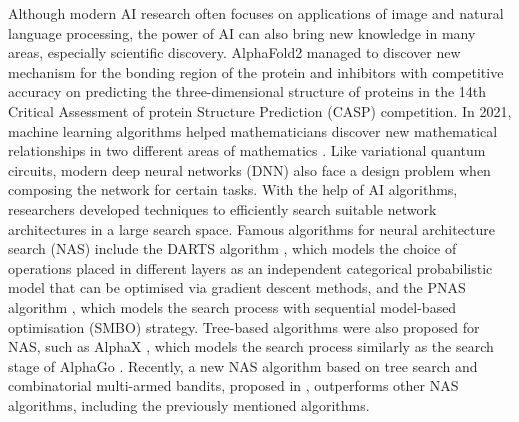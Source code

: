 \documentclass{ieeeaccess}
\begin{document}
Although modern AI research often focuses on applications of image and natural language processing, the power of AI can also bring new knowledge in many areas, especially scientific discovery. 
AlphaFold2 managed to discover new mechanism for the bonding region of the protein and inhibitors \cite{alphafold2Jumper2021-lw} with competitive accuracy on predicting the three-dimensional structure of proteins in the 14th Critical Assessment of protein Structure Prediction (CASP) competition. In 2021, machine learning algorithms helped mathematicians discover new mathematical relationships in two different areas of mathematics \cite{Davies2021-xh}. Like variational quantum circuits, modern deep neural networks (DNN) also face a design problem when composing the network for certain tasks. With the help of AI algorithms, researchers developed techniques to efficiently search suitable network architectures in a large search space. Famous algorithms for neural architecture search (NAS) include the DARTS algorithm \cite{DARTS_DBLP:conf/iclr/LiuSY19}, which models the choice of operations placed in different layers as an independent categorical probabilistic model that can be optimised via gradient descent methods, and the PNAS algorithm \cite{PNAS10.1007/978-3-030-01246-5_2}, which models the search process with sequential model-based optimisation (SMBO) strategy. %
Tree-based algorithms were also proposed for NAS, such as AlphaX \cite{AlphaXDBLP:conf/aaai/WangZJTF20}, which models the search process similarly as the search stage of AlphaGo \cite{AlphaGoDBLP:journals/nature/SilverHMGSDSAPL16}. Recently, a new NAS algorithm based on tree search and combinatorial multi-armed bandits, proposed in \cite{huang2021neural}, outperforms other NAS algorithms, including the previously mentioned algorithms.
\end{document}
